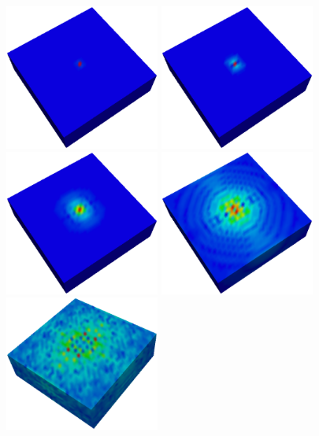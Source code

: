 \begin{figure}[t]
\begin{center}
\includegraphics[width=2in]{figures/Wavet0}
\includegraphics[width=2in]{figures/Wavet1}
\includegraphics[width=2in]{figures/Wavet3}
\includegraphics[width=2in]{figures/Wavet10}
\includegraphics[width=2in]{figures/Wavet30}

\end{center}
\end{figure}
